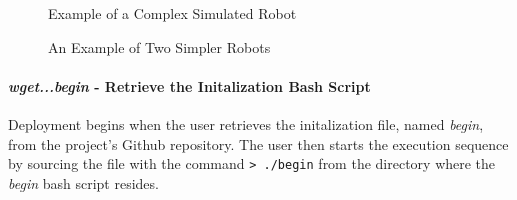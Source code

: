 \documentclass[9pt,twocolumn,twoside]{../../styles/osajnl}
\begin{document}
\begin{figure}[htbp]
\centering
{}
\caption{Example of a Complex Simulated Robot}
\label{fig:complexRobot}
\end{figure}

\begin{figure}[htbp]
\centering
{}
\caption{An Example of Two Simpler Robots}
\label{fig:simplerRobots}
\end{figure}

\paragraph{\textit{wget...begin} - Retrieve the Initalization Bash Script}
Deployment begins when the user retrieves the initalization file, named \textit{begin}, from the project's Github repository.  The user then starts the execution sequence by sourcing the file with the command \newline
{\color{green} \lstinline[style=BashInputStyle]!> ./begin! } \newline
from the directory where the \textit{begin} bash script resides.  
\end{document}
